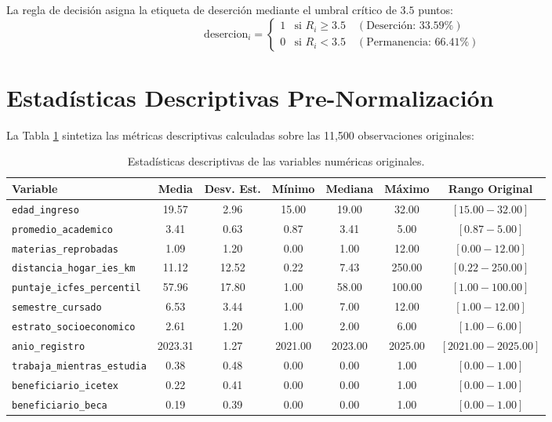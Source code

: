 \documentclass[11pt,a4paper]{article}
\begin{document}
La regla de decisión asigna la etiqueta de deserción mediante el umbral crítico de $3.5$ puntos:
\begin{equation}
\text{desercion}_i = \begin{cases} 1 & \text{si } R_i \ge 3.5 \quad (\text{Deserción: 33.59\%}) \\ 0 & \text{si } R_i < 3.5 \quad (\text{Permanencia: 66.41\%}) \end{cases}
\end{equation}

\section{Estadísticas Descriptivas Pre-Normalización}

La Tabla \ref{tab:stats} sintetiza las métricas descriptivas calculadas sobre las 11,500 observaciones originales:

\begin{table}[htbp]
\centering
\small
\begin{tabular}{l c c c c c c}
\toprule
\textbf{Variable} & \textbf{Media} & \textbf{Desv. Est.} & \textbf{Mínimo} & \textbf{Mediana} & \textbf{Máximo} & \textbf{Rango Original} \\
\midrule
\texttt{edad\_ingreso} & 19.57 & 2.96 & 15.00 & 19.00 & 32.00 & $[15.00 - 32.00]$ \\
\texttt{promedio\_academico} & 3.41 & 0.63 & 0.87 & 3.41 & 5.00 & $[0.87 - 5.00]$ \\
\texttt{materias\_reprobadas} & 1.09 & 1.20 & 0.00 & 1.00 & 12.00 & $[0.00 - 12.00]$ \\
\texttt{distancia\_hogar\_ies\_km} & 11.12 & 12.52 & 0.22 & 7.43 & 250.00 & $[0.22 - 250.00]$ \\
\texttt{puntaje\_icfes\_percentil} & 57.96 & 17.80 & 1.00 & 58.00 & 100.00 & $[1.00 - 100.00]$ \\
\texttt{semestre\_cursado} & 6.53 & 3.44 & 1.00 & 7.00 & 12.00 & $[1.00 - 12.00]$ \\
\texttt{estrato\_socioeconomico} & 2.61 & 1.20 & 1.00 & 2.00 & 6.00 & $[1.00 - 6.00]$ \\
\texttt{anio\_registro} & 2023.31 & 1.27 & 2021.00 & 2023.00 & 2025.00 & $[2021.00 - 2025.00]$ \\
\texttt{trabaja\_mientras\_estudia} & 0.38 & 0.48 & 0.00 & 0.00 & 1.00 & $[0.00 - 1.00]$ \\
\texttt{beneficiario\_icetex} & 0.22 & 0.41 & 0.00 & 0.00 & 1.00 & $[0.00 - 1.00]$ \\
\texttt{beneficiario\_beca} & 0.19 & 0.39 & 0.00 & 0.00 & 1.00 & $[0.00 - 1.00]$ \\
\bottomrule
\end{tabular}
\caption{Estadísticas descriptivas de las variables numéricas originales.}
\label{tab:stats}
\end{table}
\end{document}
